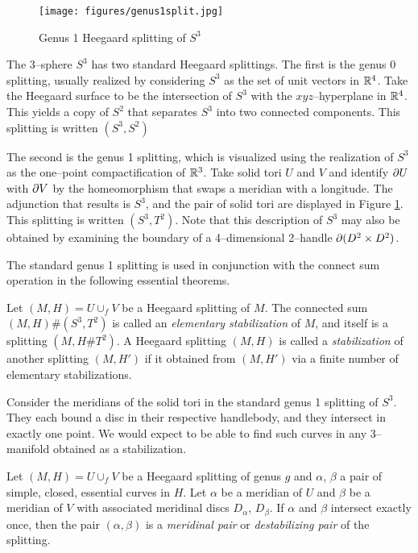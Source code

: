 \begin{figure}
		\centering
		\caption{Genus 1 Heegaard splitting of $S^3$}
		\texttt{[image: figures/genus1split.jpg]}
		\label{fig:genus1split}
\end{figure}

\begin{ex}
	The 3--sphere $S^3$ has two standard Heegaard splittings.
	The first is the genus 0 splitting, usually realized by considering $S^3$ as the set of unit vectors in $\mathbb{R}^4$.
	Take the Heegaard surface to be the intersection of $S^3$ with the $xyz$--hyperplane in $\mathbb{R}^4$.
	This yields a copy of $S^2$ that separates $S^3$ into two connected components.
	This splitting is written $(S^3,S^2)$
	
	The second is the genus 1 splitting, which is visualized using the realization of $S^3$ as the one--point compactification of $\mathbb{R}^3$.
	Take solid tori $U$ and $V$ and identify $\partial U$ with $\partial V$ by the homeomorphism that swaps a meridian with a longitude.
	The adjunction that results is $S^3$, and the pair of solid tori are displayed in Figure \ref{fig:genus1split}.
	This splitting is written $(S^3,T^2)$.
	Note that this description of $S^3$ may also be obtained by examining the boundary of a 4--dimensional 2--handle $\partial (D^2\times D^2)$.
\end{ex}

The standard genus 1 splitting is used in conjunction with the connect sum operation in the following essential theorems.


	
\begin{defn}
	Let $(M,H)=U\cup_f V$ be a Heegaard splitting of $M$.
	The connected sum $(M,H)\#(S^3,T^2)$ is called an \emph{elementary stabilization} of $M$, and itself is a splitting $(M,H\#T^2)$.
	A Heegaard splitting $(M,H)$ is called a \emph{stabilization} of another splitting $(M,H')$ if it obtained from $(M,H')$ via a finite number of elementary stabilizations.
\end{defn}

Consider the meridians of the solid tori in the standard genus 1 splitting of $S^3$.
They each bound a disc in their respective handlebody, and they intersect in exactly one point.
We would expect to be able to find such curves in any 3--manifold obtained as a stabilization.
	
\begin{defn}	
	Let $(M,H)=U\cup_f V$ be a Heegaard splitting of genus $g$ and $\alpha$, $\beta$ a pair of simple, closed, essential curves in $H$.
	Let $\alpha$ be a meridian of $U$ and $\beta$ be a meridian of $V$ with associated meridinal discs $D_\alpha$, $D_\beta$.
	If $\alpha$ and $\beta$ intersect exactly once, then the pair $(\alpha,\beta)$ is a \emph{meridinal pair} or \emph{destabilizing pair} of the splitting.
\end{defn}

